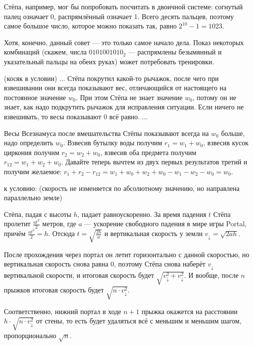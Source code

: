 \begin{itemize}
\itA Стёпа, например, мог бы попробовать посчитать в двоичной системе:
согнутый палец означает 0, распрямлённый означает 1. Всего десять пальцев,
поэтому самое большое число, которое можно показать так, равно $2^{10}-1 = 1023$.

Хотя, конечно, данный совет --- это только самое начало дела. Показ некоторых
комбинаций (скажем, числа $0101001010_2$ --- распрямлены безымянный и указательный
пальцы на обеих руках) может потребовать тренировки.


\itB (косяк в условии) ... Стёпа покрутил какой-то рычажок, после чего при взвешивании
они всегда показывают вес, отличающийся от настоящего на постоянное значение $w_0$. 
При этом Стёпа не знает значение $w_0$, потому он не знает, как надо подкрутить 
рычажок для исправления ситуации. Если ничего не взвешивать, то весы показывают 0 всё равно.  ...

Весы Всезнамуса после вмешательства Стёпы показывают всегда на $w_0$ больше, надо определить $w_0$.
Взвесив бутылку воды получим $r_1 = w_1 + w_0$, взвесив кусок циркония получим $r_2 = w_2 + w_0$,
взвесив оба предмета получим $r_{12} = w_1 + w_2 + w_0$. Давайте теперь вычтем из двух 
первых результатов третий и получим желаемое: 
$r_1 + r_2 - r_{12} = w_1 + w_0 + w_2 + w_0 - w_1 - w_2 - w_0 = w_0$.

\itC 
к условию: (скорость не изменяется по абсолютному значению, но направлена параллельно земле)

Стёпа, падая с высоты $h$, падает равноускоренно. За время падения $t$ Стёпа пролетит 
$\frac{at^2}{2}$ метров, где $a$ --- ускорение свободного падения в мире игры Portal, 
причём $\frac{at^2}{2} = h$. Отсюда $t = \sqrt{\frac{2h}{a}}$ и вертикальная скорость
у земли $v_\downarrow = \sqrt{2ah}$.

После прохождения через портал он летит горизонтально с данной скоростью, но вертикальная
скорость снова равна 0, поэтому Стёпа снова наберёт $v_\downarrow$ вертикальной скорости, и
итоговая скорость будет $\sqrt{v_\downarrow^2 + v_\downarrow^2}$.
И вообще, после $n$ прыжков итоговая скорость будет $\sqrt{n \cdot v_\downarrow^2}$.

Соответственно, нижний портал в ходе $n+1$ прыжка окажется на расстоянии 
$h \cdot \sqrt{n \cdot v_\downarrow^2}$ от стены,
то есть будет удаляться всё с меньшим и меньшим шагом, пропорционально $\sqrt{n}$.

\end{itemize}

